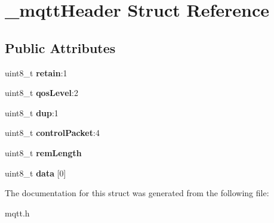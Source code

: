 \hypertarget{struct__mqttHeader}{}\section{\+\_\+mqtt\+Header Struct Reference}
\label{struct__mqttHeader}
\subsection*{Public Attributes}
\begin{DoxyCompactItemize}
\item 
\mbox{\label{struct__mqttHeader_a4bb9f2efb2fad66697a49ca223404707}} 
uint8\+\_\+t {\bfseries retain}\+:1
\item 
\mbox{\label{struct__mqttHeader_ad1968d139e05f0dbb0deeaffbe44200d}} 
uint8\+\_\+t {\bfseries qos\+Level}\+:2
\item 
\mbox{\label{struct__mqttHeader_aaf6dd4ab86a9a77df65f661b7c2eb6a3}} 
uint8\+\_\+t {\bfseries dup}\+:1
\item 
\mbox{\label{struct__mqttHeader_a81bf12c5a9d678f05619fa5b3d917516}} 
uint8\+\_\+t {\bfseries control\+Packet}\+:4
\item 
\mbox{\label{struct__mqttHeader_ab2a0ef860aab83b8ac76bc9fe9d3cfe5}} 
uint8\+\_\+t {\bfseries rem\+Length}
\item 
\mbox{\label{struct__mqttHeader_a210631612026cc00977602020ff7cf26}} 
uint8\+\_\+t {\bfseries data} \mbox{[}0\mbox{]}
\end{DoxyCompactItemize}


The documentation for this struct was generated from the following file\+:\begin{DoxyCompactItemize}
\item 
mqtt.\+h\end{DoxyCompactItemize}
